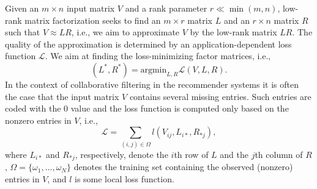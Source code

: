  \smallskip
 
 Given an $m \times n$ input matrix $V$ and a rank parameter $r \ll \min{(m,n)}$, low-rank matrix factorization seeks to find an $m \times r$ matrix $L$ and an $r \times n$ matrix $R$ such that $V \approx LR$, i.e., we aim to approximate $V$ by the low-rank matrix $LR$.
 The quality of the approximation is determined by an application-dependent loss function $\mathcal{L}$. We aim at finding the loss-minimizing factor matrices, i.e., 
 \begin{equation}\label{eq:problem}
 (L^*, R^*) = \textrm{argmin}_{L,R}{\mathcal{L}(V,L,R)}.
 \end{equation} 
 In the context of collaborative filtering in the recommender systems it is often the case that the input matrix $V$ contains several missing entries. Such entries are coded with the 0 value and the loss function is computed only based on the nonzero entries in $V$, i.e.,
 \begin{equation*} %
 \mathcal{L}=\sum_{(i,j)\in\Omega}l(V_{ij},L_{i*},R_{*j}),
 \end{equation*} 
 where $L_{i*}$ and $R_{*j}$, respectively, denote the $i$th row of $L$ and the $j$th column of $R$, $\Omega=\{\omega_1,\dots,\omega_N\}$ denotes the training set containing the observed (nonzero) entries in $V$, and $l$ is some local loss function.  
 

